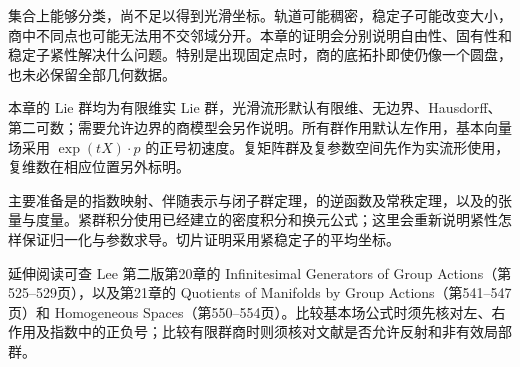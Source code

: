 \ProseParagraphBreak

集合上能够分类，尚不足以得到光滑坐标。轨道可能稠密，稳定子可能改变大小，商中不同点也可能无法用不交邻域分开。本章的证明会分别说明自由性、固有性和稳定子紧性解决什么问题。特别是出现固定点时，商的底拓扑即使仍像一个圆盘，也未必保留全部几何数据。

\ProseParagraphBreak

本章的 Lie 群均为有限维实 Lie 群，光滑流形默认有限维、无边界、Hausdorff、第二可数；需要允许边界的商模型会另作说明。所有群作用默认左作用，基本向量场采用 \(\exp(tX)\cdot p\) 的正号初速度。复矩阵群及复参数空间先作为实流形使用，复维数在相应位置另外标明。

\ProseParagraphBreak

主要准备是的指数映射、伴随表示与闭子群定理，的逆函数及常秩定理，以及的张量与度量。紧群积分使用已经建立的密度积分和换元公式；这里会重新说明紧性怎样保证归一化与参数求导。切片证明采用紧稳定子的平均坐标。

\ProseParagraphBreak

延伸阅读可查 Lee 第二版第20章的 Infinitesimal Generators of Group Actions（第525--529页），以及第21章的 Quotients of Manifolds by Group Actions（第541--547页）和 Homogeneous Spaces（第550--554页）\cite[第525--529、541--547、550--554页]{Lee2012Smooth}。比较基本场公式时须先核对左、右作用及指数中的正负号；比较有限群商时则须核对文献是否允许反射和非有效局部群。






